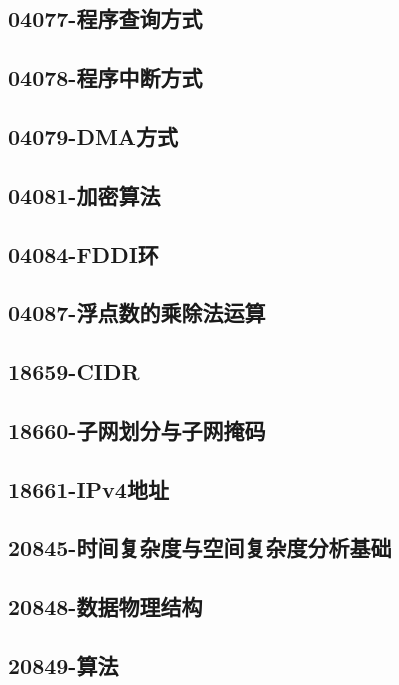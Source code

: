 \subsection{04077-程序查询方式}

\subsection{04078-程序中断方式}

\subsection{04079-DMA方式}

\subsection{04081-加密算法}

\subsection{04084-FDDI环}

\subsection{04087-浮点数的乘除法运算}

\subsection{18659-CIDR}

\subsection{18660-子网划分与子网掩码}

\subsection{18661-IPv4地址}

\subsection{20845-时间复杂度与空间复杂度分析基础}

\subsection{20848-数据物理结构}

\subsection{20849-算法}

